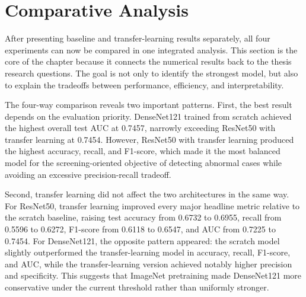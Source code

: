 \section{Comparative Analysis}
After presenting baseline and transfer-learning results separately, all four experiments can now be compared in one integrated analysis. This section is the core of the chapter because it connects the numerical results back to the thesis research questions. The goal is not only to identify the strongest model, but also to explain the tradeoffs between performance, efficiency, and interpretability.

\begin{table}[htbp]
    \centering
    \caption{Final comparison of all four experiments}
    \label{tab:final-comparison}
\end{table}

The four-way comparison reveals two important patterns. First, the best result depends on the evaluation priority. DenseNet121 trained from scratch achieved the highest overall test AUC at 0.7457, narrowly exceeding ResNet50 with transfer learning at 0.7454. However, ResNet50 with transfer learning produced the highest accuracy, recall, and F1-score, which made it the most balanced model for the screening-oriented objective of detecting abnormal cases while avoiding an excessive precision-recall tradeoff.

Second, transfer learning did not affect the two architectures in the same way. For ResNet50, transfer learning improved every major headline metric relative to the scratch baseline, raising test accuracy from 0.6732 to 0.6955, recall from 0.5596 to 0.6272, F1-score from 0.6118 to 0.6547, and AUC from 0.7225 to 0.7454. For DenseNet121, the opposite pattern appeared: the scratch model slightly outperformed the transfer-learning model in accuracy, recall, F1-score, and AUC, while the transfer-learning version achieved notably higher precision and specificity. This suggests that ImageNet pretraining made DenseNet121 more conservative under the current threshold rather than uniformly stronger.

